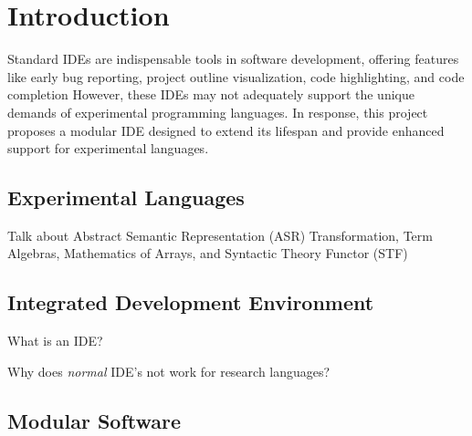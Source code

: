 \chapter{Introduction}

Standard IDEs are indispensable tools in software development, offering features
like early bug reporting, project outline visualization, code highlighting, and
code completion However, these IDEs may not adequately support the unique
demands of experimental programming languages.
In response, this project proposes
a modular IDE designed to extend its lifespan and provide enhanced support for
experimental languages.

\section{Experimental Languages}

Talk about Abstract Semantic Representation (ASR) Transformation,
Term Algebras, Mathematics of Arrays, and Syntactic Theory Functor (STF)

\section{Integrated Development Environment}

What is an IDE?

Why does \textit{normal} IDE's not work for research languages?

\section{Modular Software}
